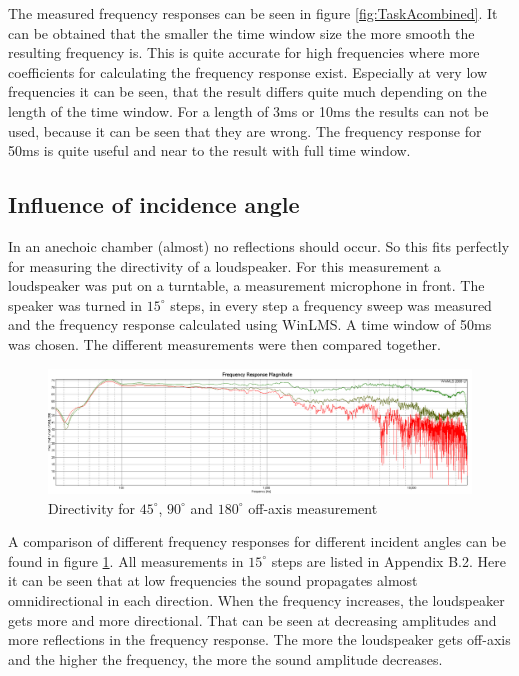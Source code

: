 \documentclass{article}
\begin{document}
The measured frequency responses can be seen in figure \ref{fig:TaskAcombined}.
It can be obtained that the smaller the time window size the more smooth the resulting frequency is. This is quite accurate for high frequencies where more coefficients for calculating the frequency response exist. Especially at very low frequencies it can be seen, that the result differs quite much depending on the length of the time window. For a length of 3ms or 10ms the results can not be used, because it can be seen that they are wrong. The frequency response for 50ms is quite useful and near to the result with full time window.
\subsection{Influence of incidence angle}
In an anechoic chamber (almost) no reflections should occur. So this fits perfectly for measuring the directivity of a loudspeaker. For this measurement a loudspeaker was put on a turntable, a measurement microphone in front. The speaker was turned in $15^\circ$ steps, in every step a frequency sweep was measured and the frequency response calculated using WinLMS. A time window of 50ms was chosen. The different measurements were then compared together.\\
\begin{figure}[htbp]
\begin{center}
\includegraphics[width=15cm,keepaspectratio=true]{Figures/TaskBcomparison}
\caption{Directivity for $45^\circ$, $90^\circ$ and $180^\circ$ off-axis measurement}
\label{fig:TaskBcomparison}
\end{center}
\end{figure}
A comparison of different frequency responses for different incident angles can be found in figure \ref{fig:TaskBcomparison}. All measurements in $15^\circ$ steps are listed in Appendix B.2.
Here it can be seen that at low frequencies the sound propagates almost omnidirectional in each direction. When the frequency increases, the loudspeaker gets more and more directional. That can be seen at decreasing amplitudes and more reflections in the frequency response. The more the loudspeaker gets off-axis and the higher the frequency, the more the sound amplitude decreases.
\end{document}
